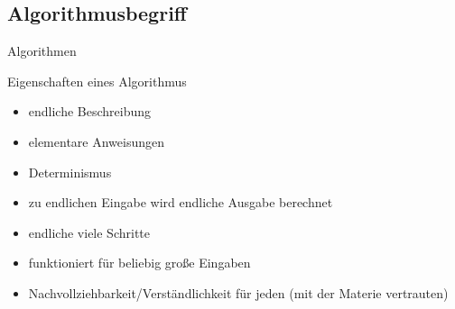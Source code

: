 \subsection{Algorithmusbegriff}

\begin{frame}{Algorithmen}
\begin{block}{Eigenschaften eines Algorithmus}
\begin{itemize}
  \item endliche Beschreibung
  \item elementare Anweisungen
  \item Determinismus
  \item zu endlichen Eingabe wird endliche Ausgabe berechnet
  \item endliche viele Schritte
  \item funktioniert für beliebig große Eingaben
  \item Nachvollziehbarkeit/Verständlichkeit für jeden (mit der Materie vertrauten)
  \end{itemize}
\end{block}
    


\end{frame}


